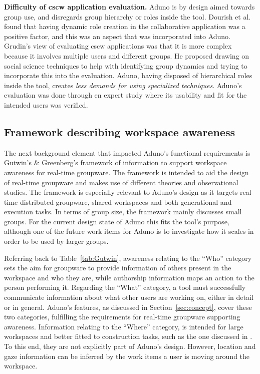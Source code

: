 \documentclass[conference]{IEEEtran}
\begin{document}
\textbf{Difficulty of {\sc cscw} application evaluation.} Aduno is by design aimed towards group use, and disregards group hierarchy or roles inside the tool.  Dourish et al. found that having dynamic role creation in the collaborative application was a positive factor\cite{Dourish:1992:ACS:143457.143468}, and this was an aspect that was incorporated into Aduno. Grudin's view of evaluating {\sc cscw} applications was that it is more complex because it involves multiple users and different groups. He proposed drawing on social science techniques to help with identifying group dynamics and trying to incorporate this into the evaluation. Aduno, having disposed of hierarchical roles inside the tool, creates \textit{less demands for using specialized techniques}. Aduno's evaluation was done through en expert study where its usability and fit for the intended users was verified.

\subsection{Framework describing workspace awareness}
The next background element that impacted Aduno's functional requirements is Gutwin's \& Greenberg's \cite{GG02} framework of information to support workspace awareness for real-time groupware. The framework is intended to aid the design of real-time groupware and makes use of different theories and observational studies. The framework is especially relevant to Aduno's design as it targets real-time distributed groupware, shared workspaces and both generational and execution tasks. In terms of group size, the framework mainly discusses small groups. For the current design state of Aduno this fits the tool's purpose, although one of the future work items for Aduno is to investigate how it scales in order to be used by larger groups.

Referring back to Table~\ref{tab:Gutwin}, awareness relating to the ``Who'' category sets the aim for groupware to provide information of others present in the workspace and who they are, while authorship information maps an action to the person performing it. Regarding the ``What'' category, a tool must successfully communicate information about what other users are working on, either in detail or in general. Aduno's features, as discussed in Section~\ref{sec:concept}, cover these two categories, fulfilling the requirements for real-time groupware supporting awareness. Information relating to the ``Where'' category, is intended for large workspaces and better fitted to construction tasks, such as the one discussed in \cite{GRG96}. To this end, they are not explicitly part of Aduno's design. However, location and gaze information can be inferred by the work items a user is moving around the workspace.
\end{document}
